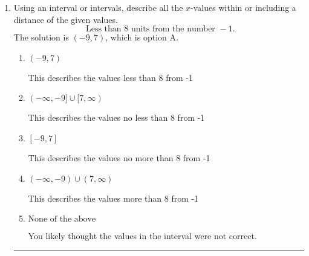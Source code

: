 \documentclass{extbook}[14pt]
\newcommand{\litem}[1]{\item #1

\rule{\textwidth}{0.4pt}}
\begin{document}
\begin{enumerate}
{\begin{enumerate}[label=\Alph*.]
* $(-\infty, 1.6]$, which is the correct option.
\item \( (-\infty, a], \text{ where } a \in [-1.6, -0.6] \)

 $(-\infty, -1.6]$, which corresponds to negating the endpoint of the solution.
\item \( [a, \infty), \text{ where } a \in [-0.6, 3.4] \)

 $[1.6, \infty)$, which corresponds to switching the direction of the interval. You likely did this if you did not flip the inequality when dividing by a negative!
\item \( [a, \infty), \text{ where } a \in [-3.4, -0.4] \)

 $[-1.6, \infty)$, which corresponds to switching the direction of the interval AND negating the endpoint. You likely did this if you did not flip the inequality when dividing by a negative as well as not moving values over to a side properly.
\item \( \text{None of the above}. \)

You may have chosen this if you thought the inequality did not match the ends of the intervals.
\end{enumerate}

\textbf{General Comment:} Remember that less/greater than or equal to includes the endpoint, while less/greater do not. Also, remember that you need to flip the inequality when you multiply or divide by a negative.
}
\litem{
Using an interval or intervals, describe all the $x$-values within or including a distance of the given values.
\[ \text{ Less than } 8 \text{ units from the number } -1. \]The solution is \( (-9, 7) \), which is option A.\begin{enumerate}[label=\Alph*.]
\item \( (-9, 7) \)

This describes the values less than 8 from -1
\item \( (-\infty, -9] \cup [7, \infty) \)

This describes the values no less than 8 from -1
\item \( [-9, 7] \)

This describes the values no more than 8 from -1
\item \( (-\infty, -9) \cup (7, \infty) \)

This describes the values more than 8 from -1
\item \( \text{None of the above} \)

You likely thought the values in the interval were not correct.
\end{enumerate}

}
\end{enumerate}
\end{document}
